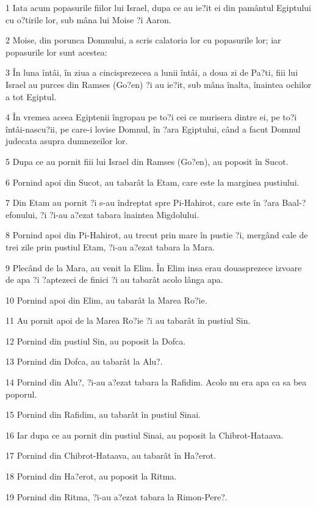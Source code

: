 \par 1 Iata acum popasurile fiilor lui Israel, dupa ce au ie?it ei din pamântul Egiptului cu o?tirile lor, sub mâna lui Moise ?i Aaron.
\par 2 Moise, din porunca Domnului, a scris calatoria lor cu popasurile lor; iar popasurile lor sunt acestea:
\par 3 În luna întâi, în ziua a cincisprezecea a lunii întâi, a doua zi de Pa?ti, fiii lui Israel au purces din Ramses (Go?en) ?i au ie?it, sub mâna înalta, înaintea ochilor a tot Egiptul.
\par 4 În vremea aceea Egiptenii îngropau pe to?i cei ce murisera dintre ei, pe to?i întâi-nascu?ii, pe care-i lovise Domnul, în ?ara Egiptului, când a facut Domnul judecata asupra dumnezeilor lor.
\par 5 Dupa ce au pornit fiii lui Israel din Ramses (Go?en), au poposit în Sucot.
\par 6 Pornind apoi din Sucot, au tabarât la Etam, care este la marginea pustiului.
\par 7 Din Etam au pornit ?i s-au îndreptat spre Pi-Hahirot, care este în ?ara Baal-?efonului, ?i ?i-au a?ezat tabara înaintea Migdolului.
\par 8 Pornind apoi din Pi-Hahirot, au trecut prin mare în pustie ?i, mergând cale de trei zile prin pustiul Etam, ?i-au a?ezat tabara la Mara.
\par 9 Plecând de la Mara, au venit la Elim. În Elim insa erau douasprezece izvoare de apa ?i ?aptezeci de finici ?i au tabarât acolo lânga apa.
\par 10 Pornind apoi din Elim, au tabarât la Marea Ro?ie.
\par 11 Au pornit apoi de la Marea Ro?ie ?i au tabarât în pustiul Sin.
\par 12 Pornind din pustiul Sin, au poposit la Dofca.
\par 13 Pornind din Dofca, au tabarât la Alu?.
\par 14 Pornind din Alu?, ?i-au a?ezat tabara la Rafidim. Acolo nu era apa ca sa bea poporul.
\par 15 Pornind din Rafidim, au tabarât în pustiul Sinai.
\par 16 Iar dupa ce au pornit din pustiul Sinai, au poposit la Chibrot-Hataava.
\par 17 Pornind din Chibrot-Hataava, au tabarât în Ha?erot.
\par 18 Pornind din Ha?erot, au poposit la Ritma.
\par 19 Pornind din Ritma, ?i-au a?ezat tabara la Rimon-Pere?.
